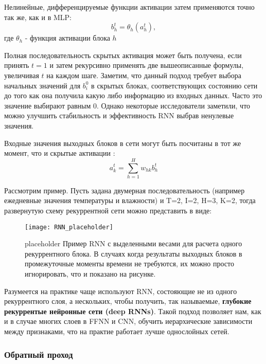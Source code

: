 Нелинейные, дифференцируемые функции активации затем применяются точно так же, как 
и в MLP:
\begin{equation*}
    b_h^t = \theta_h (a_h^t),
\end{equation*}
где $\theta_h$ - функция активации блока $h$

Полная последовательность скрытых активация может быть получена, если принять 
$t=1$ и затем рекурсивно применять две вышеописанные формулы, увеличивая $t$ 
на каждом шаге. Заметим, что данный подход требует выбора начальных значений 
для $b_i^0$ в скрытых блоках, соответствующих состоянию сети до того как 
она получила какую либо информацию из входных данных. Часто это значение 
выбирают равным 0. Однако некоторые исследователи заметили, что можно улучшить 
стабильность и эффективность RNN выбрав ненулевые значения.

Входные значения выходных блоков в сети могут быть посчитаны в тот же момент, что 
и скрытые активации \cite{graves}:
\begin{equation*}
    a_k^t = \sum_{h=1}^H w_{hk} b_h^t
\end{equation*}

\newpage

Рассмотрим пример. Пусть задана двумерная последовательность 
(например ежедневные значения температуры и влажности) и T=2, I=2, H=3, K=2, 
тогда развернутую схему рекуррентной сети можно представить в виде:
\begin{figure}[h!]
    \centering
    \texttt{[image: RNN\_placeholder]}
    \caption{{\color{red} placeholder} Пример RNN с выделенными весами для 
    расчета одного рекуррентного блока. В случаях когда результаты 
    выходных блоков в промежуточные моменты времени не требуются, их 
    можно просто игнорировать, что и показано на рисунке.}
    \label{fig:RNN_placeholder}
\end{figure}

Разумеется на практике чаще используют RNN, состояющие не из одного 
рекуррентного слоя, а нескольких, чтобы получить, так называемые, 
\textbf{глубокие рекуррентые нейронные сети (deep RNNs)}. Такой подход 
позволяет нам, как и в случае многих слоев в FFNN и CNN, 
обучить иерархические зависимости между признаками, что на практие 
работает лучше однослойных сетей. 

\subsubsection{Обратный проход}

